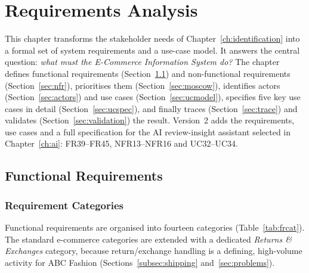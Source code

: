 \documentclass[11pt,a4paper,oneside]{extreport}
\newif\ifshowvtwo
\newcommand{\upd}[1]{\ifshowvtwo\textcolor{red}{#1}\else#1\fi}
\begin{document}
\chapter{Requirements Analysis}
\label{ch:analysis}

This chapter transforms the stakeholder needs of Chapter~\ref{ch:identification} into a formal set of system requirements and a use-case model. It answers the central question: \emph{what must the E-Commerce Information System do?} The chapter defines functional requirements (Section~\ref{sec:fr}) and non-functional requirements (Section~\ref{sec:nfr}), prioritises them (Section~\ref{sec:moscow}), identifies actors (Section~\ref{sec:actors}) and use cases (Section~\ref{sec:ucmodel}), specifies five key use cases in detail (Section~\ref{sec:ucspec}), and finally traces (Section~\ref{sec:trace}) and validates (Section~\ref{sec:validation}) the result. \upd{Version~2 adds the requirements, use cases and a full specification for the AI review-insight assistant selected in Chapter~\ref{ch:ai}: FR39--FR45, NFR13--NFR16 and UC32--UC34.}

\section{Functional Requirements}
\label{sec:fr}

\subsection{Requirement Categories}
Functional requirements are organised into \upd{fourteen} categories (Table~\ref{tab:frcat}). The standard e-commerce categories are extended with a dedicated \emph{Returns \& Exchanges} category, because return/exchange handling is a defining, high-volume activity for ABC Fashion (Sections~\ref{subsec:shipping} and~\ref{sec:problems}).
\end{document}
